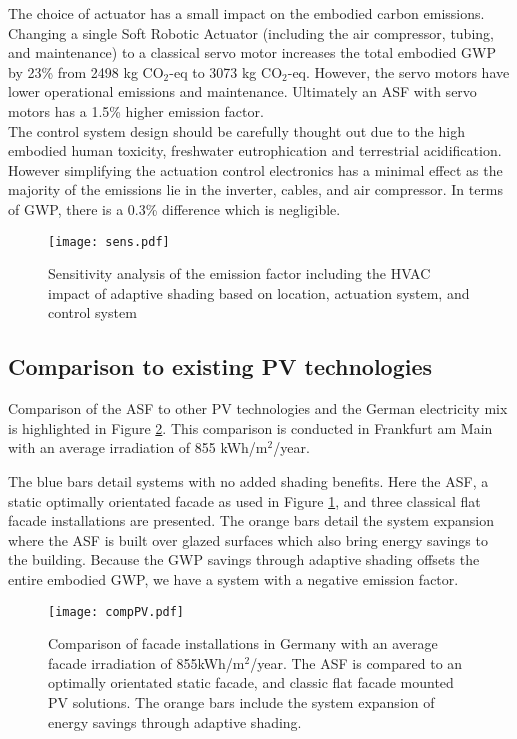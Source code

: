 The choice of actuator has a small impact on the embodied carbon emissions. Changing a single Soft Robotic Actuator (including the air compressor, tubing, and maintenance) to a classical servo motor increases the total embodied GWP by 23\% from 2498 kg CO$_{2}$-eq to 3073 kg CO$_{2}$-eq. However, the servo motors have lower operational emissions and maintenance. Ultimately an ASF with servo motors has a 1.5\% higher emission factor. \\


The control system design should be carefully thought out due to the high embodied human toxicity, freshwater eutrophication and terrestrial acidification. However simplifying the actuation control electronics has a minimal effect as the majority of the emissions lie in the inverter, cables, and air compressor. In terms of GWP, there is a 0.3\% difference which is negligible.



\begin{figure}[H]
\begin{center}
\texttt{[image: sens.pdf]}
\caption{Sensitivity analysis of the emission factor including the HVAC impact of adaptive shading based on location, actuation system, and control system}
\label{fig:sens}
\end{center}
\end{figure}

\subsection{Comparison to existing PV technologies}

Comparison of the ASF to other PV technologies and the German electricity mix is highlighted in Figure \ref{fig:compPV}. This comparison is conducted in Frankfurt am Main with an average irradiation of 855 kWh/m$^2$/year.\

The blue bars detail systems with no added shading benefits. Here the ASF, a static optimally orientated facade as used in Figure \ref{fig:sens}, and three classical flat facade installations are presented.  
The orange bars detail the system expansion where the ASF is built over glazed surfaces which also bring energy savings to the building. Because the GWP savings through adaptive shading offsets the entire embodied GWP, we have a system with a negative emission factor.





\begin{figure}[H]
\begin{center}
\texttt{[image: compPV.pdf]}
\caption{Comparison of facade installations in Germany with an average facade irradiation of 855kWh/m$^2$/year.
The ASF is compared to an optimally orientated static facade, and classic flat facade mounted PV solutions. The orange bars include the system expansion of energy savings through adaptive shading.}
\label{fig:compPV}
\end{center}
\end{figure}

